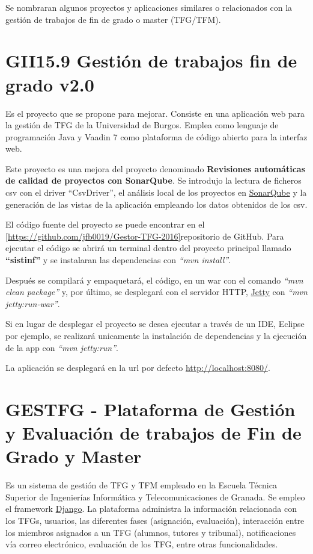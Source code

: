Se nombraran algunos proyectos y aplicaciones similares o relacionados con la gestión de trabajos de fin de grado o master (TFG/TFM). 

\section{GII15.9 Gestión de trabajos fin de grado v2.0}
Es el proyecto que se propone para mejorar. Consiste en una aplicación web para la gestión de TFG de la Universidad de Burgos. Emplea como lenguaje de programación Java y Vaadin 7 como plataforma de código abierto para la interfaz web. 

Este proyecto es una mejora del proyecto denominado \textbf{Revisiones automáticas de calidad de proyectos con SonarQube}. Se introdujo la lectura de ficheros csv con el driver ``CsvDriver'', el análisis local de los proyectos en \href{https://www.sonarqube.org/}{SonarQube} y la generación de las vistas de la aplicación empleando los datos obtenidos de los csv.

El código fuente del proyecto se puede encontrar en el \ref{https://github.com/jfb0019/Gestor-TFG-2016}{repositorio de GitHub}. Para ejecutar el código se abrirá un terminal dentro del proyecto principal llamado \textbf{``sistinf''} y se instalaran las dependencias con \emph{``mvn install''}. 

Después se compilará y empaquetará, el código, en un war con el comando \emph{``mvn clean package''} y, por último, se desplegará con el servidor HTTP, \href{https://www.eclipse.org/jetty/}{Jetty} con \emph{``mvn jetty:run-war''}. 

Si en lugar de desplegar el proyecto se desea ejecutar a través de un IDE, Eclipse por ejemplo, se realizará unicamente la instalación de dependencias y la ejecución de la app con \emph{``mvn jetty:run''}.

La aplicación se desplegará en la url por defecto \href{http://localhost:8080/}{http://localhost:8080/}.

\section{GESTFG - Plataforma de Gestión y Evaluación de trabajos de Fin de Grado y Master}
Es un sistema de gestión de TFG y TFM empleado en la Escuela Técnica Superior de Ingenierías Informática y Telecomunicaciones de Granada. Se empleo el framework \href{https://www.djangoproject.com/}{Django}. La plataforma administra la información relacionada con los TFGs, usuarios, las diferentes fases (asignación, evaluación), interacción entre los miembros asignados a un TFG (alumnos, tutores y tribunal), notificaciones vía correo electrónico, evaluación de los TFG, entre otras funcionalidades.

